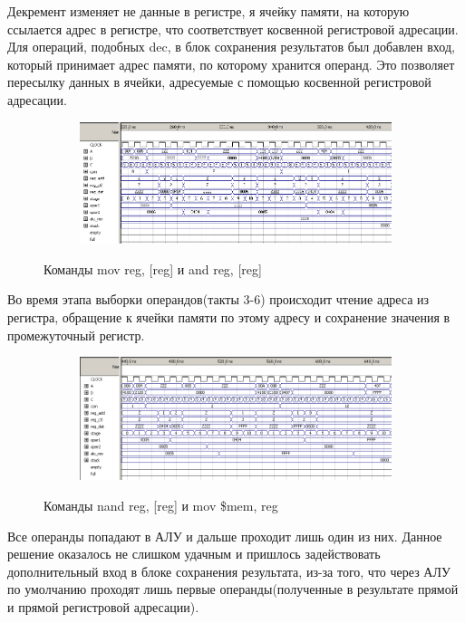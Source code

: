 Декремент изменяет не данные в регистре, я ячейку памяти, на которую ссылается адрес в регистре, что соответствует косвенной регистровой адресации.
Для операций, подобных dec, в блок сохранения результатов был добавлен вход, который принимает адрес памяти, по которому хранится операнд. Это позволяет пересылку данных в ячейки, адресуемые с помощью косвенной регистровой адресации.

\begin{figure}[ht]
\centering
  \begin{subfigure}[b]{\textwidth}
    \centering
    \includegraphics[scale=0.68]{pc_wave2_part2}
    \caption{}
  \end{subfigure}
    \caption{Команды mov reg, [reg] и and reg, [reg]}
\end{figure}

Во время этапа выборки операндов(такты 3-6) происходит чтение адреса из регистра, обращение к ячейки памяти по этому адресу и сохранение значения в промежуточный регистр.

\begin{figure}[ht]
\centering
  \begin{subfigure}[b]{\textwidth}
    \centering
    \includegraphics[scale=0.68]{pc_wave2_part3}
    \caption{}
  \end{subfigure}
    \caption{Команды nand reg, [reg] и mov \$mem, reg}
\end{figure}

Все операнды попадают в АЛУ и дальше проходит лишь один из них. Данное решение оказалось не слишком удачным и пришлось задействовать дополнительный вход в блоке сохранения результата, из-за того, что через АЛУ по умолчанию проходят лишь первые операнды(полученные в результате прямой и прямой регистровой адресации).

